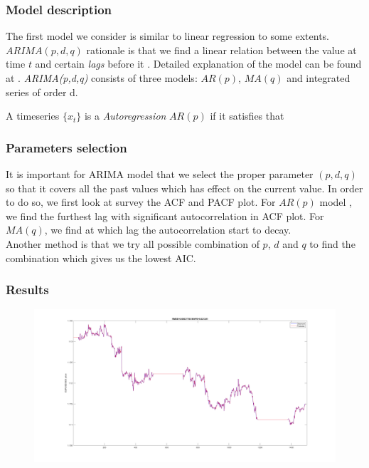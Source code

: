 \documentclass[11pt]{article}
\begin{document}
\subsubsection{Model description}
The first model we consider is similar to linear regression to some extents.
$ARIMA(p,d,q)$ rationale is that we find a linear relation between the value at
time $t$ and certain \textit{lags} before it . Detailed explanation
of the model can be found at \cite{GVK4844634242}. \textit{ARIMA(p,d,q)}
consists of three models: $AR(p)$, $MA(q)$ and integrated series of order d. 

A timeseries $\{x_t\}$ is a \textit{Autoregression} $AR(p)$ if it satisfies that

\subsubsection{Parameters selection}
It is important for ARIMA model that we select the proper parameter
$(p, d, q)$ so that it covers all the past values which has effect on the
current value. In order to do so, we first look at survey the ACF and PACF plot.
For ${AR}(p)$ model , we find the furthest lag with significant autocorrelation
in ACF plot. For
$MA(q)$, we find at which lag the autocorrelation start to decay.\\
Another method is that we try all possible combination of $p$, $d$ and $q$ to
find the combination which gives us the lowest AIC.

\subsubsection{Results}
\begin{figure}[hp]
  \centering
  \includegraphics[width=0.8\linewidth]{figs/arima_1_1_18_open.png}
  \caption{}
\end{figure}
\end{document}
